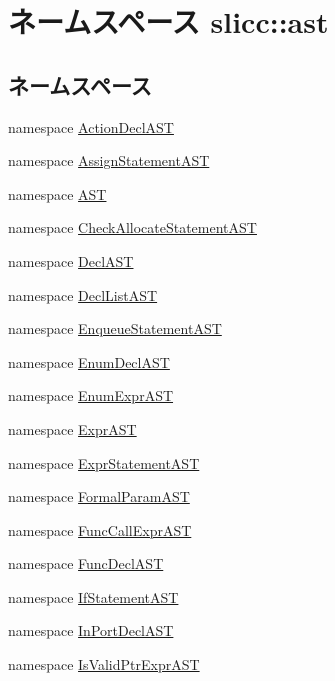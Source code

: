 \hypertarget{namespaceslicc_1_1ast}{
\section{ネームスペース slicc::ast}
\label{namespaceslicc_1_1ast}
}
\subsection*{ネームスペース}
\begin{DoxyCompactItemize}
\item 
namespace \hyperlink{namespaceslicc_1_1ast_1_1ActionDeclAST}{ActionDeclAST}
\item 
namespace \hyperlink{namespaceslicc_1_1ast_1_1AssignStatementAST}{AssignStatementAST}
\item 
namespace \hyperlink{namespaceslicc_1_1ast_1_1AST}{AST}
\item 
namespace \hyperlink{namespaceslicc_1_1ast_1_1CheckAllocateStatementAST}{CheckAllocateStatementAST}
\item 
namespace \hyperlink{namespaceslicc_1_1ast_1_1DeclAST}{DeclAST}
\item 
namespace \hyperlink{namespaceslicc_1_1ast_1_1DeclListAST}{DeclListAST}
\item 
namespace \hyperlink{namespaceslicc_1_1ast_1_1EnqueueStatementAST}{EnqueueStatementAST}
\item 
namespace \hyperlink{namespaceslicc_1_1ast_1_1EnumDeclAST}{EnumDeclAST}
\item 
namespace \hyperlink{namespaceslicc_1_1ast_1_1EnumExprAST}{EnumExprAST}
\item 
namespace \hyperlink{namespaceslicc_1_1ast_1_1ExprAST}{ExprAST}
\item 
namespace \hyperlink{namespaceslicc_1_1ast_1_1ExprStatementAST}{ExprStatementAST}
\item 
namespace \hyperlink{namespaceslicc_1_1ast_1_1FormalParamAST}{FormalParamAST}
\item 
namespace \hyperlink{namespaceslicc_1_1ast_1_1FuncCallExprAST}{FuncCallExprAST}
\item 
namespace \hyperlink{namespaceslicc_1_1ast_1_1FuncDeclAST}{FuncDeclAST}
\item 
namespace \hyperlink{namespaceslicc_1_1ast_1_1IfStatementAST}{IfStatementAST}
\item 
namespace \hyperlink{namespaceslicc_1_1ast_1_1InPortDeclAST}{InPortDeclAST}
\item 
namespace \hyperlink{namespaceslicc_1_1ast_1_1IsValidPtrExprAST}{IsValidPtrExprAST}

\end{DoxyCompactItemize}

